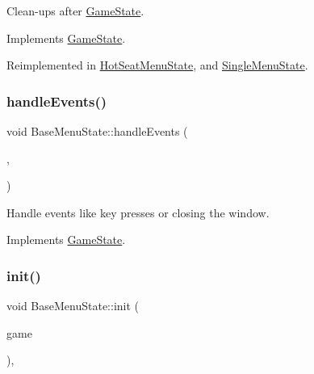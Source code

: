 Clean-\/ups after \mbox{\hyperlink{class_game_state}{Game\+State}}. 



Implements \mbox{\hyperlink{class_game_state_a7df4ea0b4815d2b3b35dbec2a399a0b6}{Game\+State}}.



Reimplemented in \mbox{\hyperlink{class_hot_seat_menu_state_ada87b1a00943777a31b8b24ddf347350}{Hot\+Seat\+Menu\+State}}, and \mbox{\hyperlink{class_single_menu_state_a61fdbb1a47f269d9f99f99ef9312624f}{Single\+Menu\+State}}.

\mbox{\label{class_base_menu_state_af593c53bcd111bd210b933ddb360f509}} 
\subsubsection{\texorpdfstring{handleEvents()}{handleEvents()}}
{\footnotesize\ttfamily void Base\+Menu\+State\+::handle\+Events (\begin{DoxyParamCaption}\item[{\mbox{\hyperlink{class_game_engine}{Game\+Engine}} $\ast$}]{,  }\item[{sf\+::\+Event}]{ }\end{DoxyParamCaption})\hspace{0.3cm}{\ttfamily [virtual]}}



Handle events like key presses or closing the window. 



Implements \mbox{\hyperlink{class_game_state_a3ef0638514dbfe71581d593cf0f66ce5}{Game\+State}}.

\mbox{\label{class_base_menu_state_ae29d522c56a4582ce79e113426421741}} 
\subsubsection{\texorpdfstring{init()}{init()}}
{\footnotesize\ttfamily void Base\+Menu\+State\+::init (\begin{DoxyParamCaption}\item[{\mbox{\hyperlink{class_game_engine}{Game\+Engine}} $\ast$}]{game }\end{DoxyParamCaption})\hspace{0.3cm}{\ttfamily [inline]}, {\ttfamily [virtual]}}



